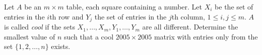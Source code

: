 Let $A$ be an $m \times m$ table, each square containing a number. Let $X_i$ be the set of
entries in the $i$th row and $Y_j$ the set of entries in the $j$th column, $1 \leq i,j \leq m$.
$A$ is called \emph{cool} if the sets $X_1,\ldots,X_m,Y_1,\ldots,Y_m$ are all different.
Determine the smallest value of $n$ such that a cool $2005 \times 2005$ matrix with entries
only from the set $\{1,2,\ldots,n\}$ exists.
